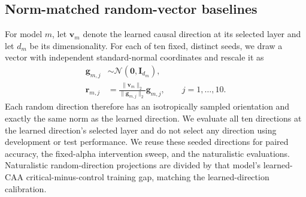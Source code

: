 \subsection{Norm-matched random-vector baselines}
\label{app:random-baselines}
For model $m$, let $\mathbf{v}_m$ denote the learned causal direction at its selected layer and let $d_m$ be its dimensionality. For each of ten fixed, distinct seeds, we draw a vector with independent standard-normal coordinates and rescale it as
\begin{equation}
\begin{aligned}
\mathbf{g}_{m,j}&\sim\mathcal{N}(\mathbf{0},\mathbf{I}_{d_m}),\\
\mathbf{r}_{m,j}
&=\frac{\lVert\mathbf{v}_m\rVert_2}{\lVert\mathbf{g}_{m,j}\rVert_2}
\mathbf{g}_{m,j}, \qquad j=1,\ldots,10.
\end{aligned}
\label{eq:random-direction}
\end{equation}
Each random direction therefore has an isotropically sampled orientation and exactly the same norm as the learned direction. We evaluate all ten directions at the learned direction's selected layer and do not select any direction using development or test performance. We reuse these seeded directions for paired accuracy, the fixed-alpha intervention sweep, and the naturalistic evaluations. Naturalistic random-direction projections are divided by that model's learned-CAA critical-minus-control training gap, matching the learned-direction calibration.
